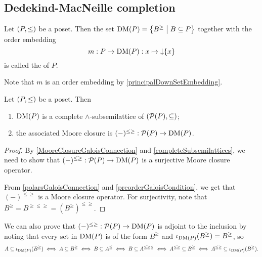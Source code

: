 \subsection{Dedekind-MacNeille completion}
\begin{definition}
Let $\sSet{P, \leq}$ be a poset. Then the set $\DM(P) = \setbuilder{B^\geq}{B\subseteq P}$ together with the order embedding
\[ m: P \to \operatorname{DM}(P): x\mapsto \operatorname{\downarrow}\{x\} \]
is called the  of $P$.
\end{definition}
Note that $m$ is an order embedding by \ref{principalDownSetEmbedding}.

\begin{proposition} \label{DedekindMacNeilleCompletionComplete}
Let $\sSet{P, \leq}$ be a poset. Then
\begin{enumerate}
\item $\operatorname{DM}(P)$ is a complete $\wedge$-subsemilattice of $\sSet{\powerset(P), \subseteq}$;
\item the associated Moore closure is $(-)^{\leq\geq}: \operatorname{\mathcal{P}}(P) \to \operatorname{DM}(P)$.
\end{enumerate}
\end{proposition}
\begin{proof}
By \ref{MooreClosureGaloisConnection} and \ref{completeSubsemilattices}, we need to show that $(-)^{\leq\geq}: \operatorname{\mathcal{P}}(P) \to \operatorname{DM}(P)$ is a surjective Moore closure operator.

From \ref{polarsGaloisConnection} and \ref{preorderGaloisCondition}, we get that $(-)^{\leq\geq}$ is a Moore closure operator. For surjectivity, note that $B^\geq = B^{\geq\leq\geq} = (B^{\geq})^{\leq\geq}$.
\end{proof}
We can also prove that $(-)^{\leq\geq}: \operatorname{\mathcal{P}}(P) \to \operatorname{DM}(P)$ is adjoint to the inclusion by noting that every set in $\operatorname{DM}(P)$ is of the form $B^\geq$ and $\operatorname{\iota}_{\operatorname{DM}(P)}(B^\geq) = B^\geq$, so
\[ A\subseteq \operatorname{\iota}_{\operatorname{DM}(P)}(B^\geq) \iff A\subseteq B^\geq \iff B\subseteq A^\leq \iff B \subseteq A^{\leq\geq\leq} \iff A^{\leq\geq} \subseteq B^\geq \iff A^{\leq\geq} \subseteq \operatorname{\iota}_{\operatorname{DM}(P)}(B^\geq). \]

